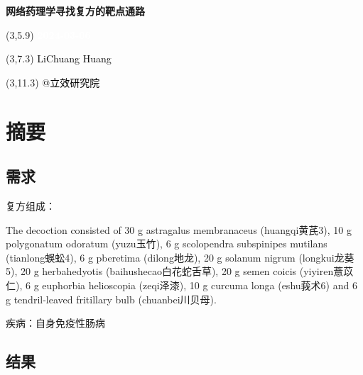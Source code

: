 \documentclass[
]{article}
\author{}
\date{\vspace{-2.5em}}
\begin{document}
\begin{titlepage} 
\begin{center} \textbf{\Huge
网络药理学寻找复方的靶点通路} \vspace{4em}
\begin{textblock}{10}(3,5.9) \huge
\textbf{\textcolor{white}{2024-03-06}}
\end{textblock} \begin{textblock}{10}(3,7.3)
\Large \textcolor{black}{LiChuang Huang}
\end{textblock} \begin{textblock}{10}(3,11.3)
\Large \textcolor{black}{@立效研究院}
\end{textblock} \end{center} \end{titlepage}
\restoregeometry


\tableofcontents

\listoffigures

\listoftables

\newpage


\hypertarget{abstract}{%
\section{摘要}\label{abstract}}

\hypertarget{ux9700ux6c42}{%
\subsection{需求}\label{ux9700ux6c42}}

复方组成：

The decoction consisted of 30 g astragalus membranaceus (huangqi黄芪3), 10 g polygonatum odoratum (yuzu玉竹), 6 g scolopendra subspinipes mutilans (tianlong蜈蚣4), 6 g pberetima (dilong地龙), 20 g solanum nigrum (longkui龙葵5), 20 g herbahedyotis (baihushecao白花蛇舌草), 20 g semen coicis (yiyiren薏苡仁), 6 g euphorbia helioscopia (zeqi泽漆), 10 g curcuma longa (eshu莪术6) and 6 g tendril-leaved fritillary bulb (chuanbei川贝母).

疾病：自身免疫性肠病

\hypertarget{ux7ed3ux679c}{%
\subsection{结果}\label{ux7ed3ux679c}}
\end{document}
